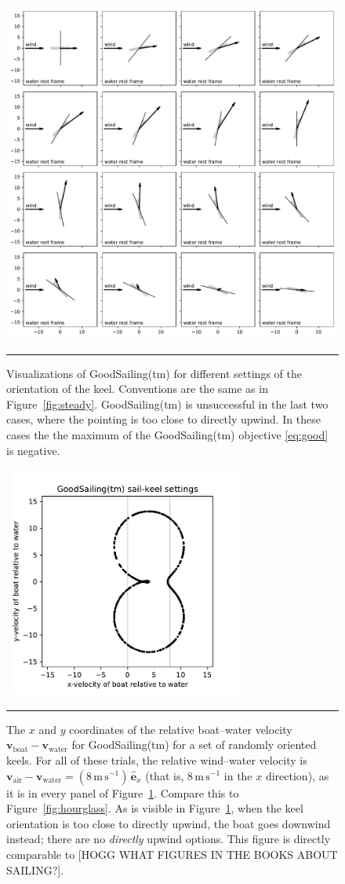 \documentclass[letterpaper]{article}
\renewcommand{\vec}[1]{\boldsymbol{#1}}
\newcommand{\uvec}{\vec{\hat{e}}}
\newcommand{\air}{\text{air}}
\newcommand{\water}{\text{water}}
\newcommand{\boat}{\text{boat}}
\newcommand{\vair}{\vec{v}_\air}
\newcommand{\vwater}{\vec{v}_\water}
\newcommand{\vboat}{\vec{v}_\boat}
\newcommand{\mps}{\mathrm{m\,s^{-1}}}
\newcommand{\figref}[1]{Figure~\ref{#1}}
\newcommand{\figurerule}{\rule[1ex]{\textwidth}{0.2pt}}
\begin{document}
\begin{figure}[t!]
  \includegraphics[width=\textwidth]{good.pdf}
  \caption{Visualizations of GoodSailing(tm) for different settings of the orientation of the keel.
  Conventions are the same as in \figref{fig:steady}.
  GoodSailing(tm) is unsuccessful in the last two cases, where the pointing is too close to directly upwind.
  In these cases the the maximum of the GoodSailing(tm) objective \eqref{eq:good} is negative.\label{fig:good}}
  \figurerule
\end{figure}
\begin{figure}[t!]
  ~\hfill\includegraphics[width=3in]{hourglass-good.pdf}\hfill~
  \caption{The $x$ and $y$ coordinates of the relative boat--water velocity $\vboat-\vwater$ for GoodSailing(tm) for a set of randomly oriented keels.
  For all of these trials, the relative wind--water velocity is $\vair-\vwater=(8\,\mps)\,\uvec_x$ (that is, $8\,\mps$ in the $x$ direction), as it is in every panel of \figref{fig:good}.
  Compare this to \figref{fig:hourglass}.
  As is visible in \figref{fig:good}, when the keel orientation is too close to directly upwind, the boat goes downwind instead; there are no \emph{directly} upwind options. This figure is directly comparable to [HOGG WHAT FIGURES IN THE BOOKS ABOUT SAILING?].\label{fig:hourgood}}
  \figurerule
\end{figure}
\end{document}
